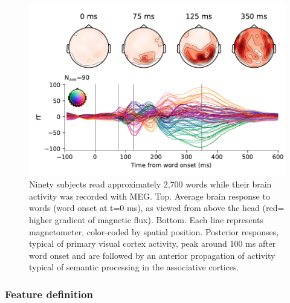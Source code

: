 \begin{figure}[t!]
  \begin{minipage}[c]{0.6\textwidth}
    \includegraphics[width=\textwidth, trim=0cm 0cm 0cm 0cm, clip=True]{figures/meg_evoked.pdf}
  \end{minipage}\hfill
  \begin{minipage}[c]{0.4\textwidth}
    \caption{Ninety subjects read approximately 2,700 words while their brain activity was recorded with MEG. Top. Average brain response to words (word onset at t=0 ms), as viewed from above the head (red= higher gradient of magnetic flux). Bottom. Each line represents magnetometer, color-coded by spatial position. Posterior responses, typical of primary visual cortex activity, peak around 100 ms after word onset and are followed by an anterior propagation of activity typical of semantic processing in the associative cortices.
    }
    \label{fig:meg_evoked}
  \end{minipage}
\end{figure}


\subsubsection{Feature definition}

